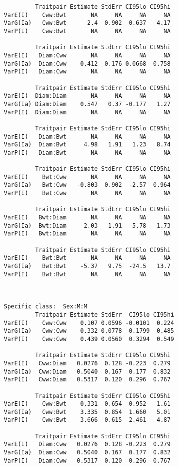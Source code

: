 \documentclass[titlepage]{article}  %
\begin{document}
\begin{verbatim}
         Traitpair Estimate StdErr CI95lo CI95hi
VarE(I)    Cww:Bwt       NA     NA     NA     NA
VarG(Ia)   Cww:Bwt      2.4  0.902  0.637   4.17
VarP(I)    Cww:Bwt       NA     NA     NA     NA

         Traitpair Estimate StdErr CI95lo CI95hi
VarE(I)   Diam:Cww       NA     NA     NA     NA
VarG(Ia)  Diam:Cww    0.412  0.176 0.0668  0.758
VarP(I)   Diam:Cww       NA     NA     NA     NA

         Traitpair Estimate StdErr CI95lo CI95hi
VarE(I)  Diam:Diam       NA     NA     NA     NA
VarG(Ia) Diam:Diam    0.547   0.37 -0.177   1.27
VarP(I)  Diam:Diam       NA     NA     NA     NA

         Traitpair Estimate StdErr CI95lo CI95hi
VarE(I)   Diam:Bwt       NA     NA     NA     NA
VarG(Ia)  Diam:Bwt     4.98   1.91   1.23   8.74
VarP(I)   Diam:Bwt       NA     NA     NA     NA

         Traitpair Estimate StdErr CI95lo CI95hi
VarE(I)    Bwt:Cww       NA     NA     NA     NA
VarG(Ia)   Bwt:Cww   -0.803  0.902  -2.57  0.964
VarP(I)    Bwt:Cww       NA     NA     NA     NA

         Traitpair Estimate StdErr CI95lo CI95hi
VarE(I)   Bwt:Diam       NA     NA     NA     NA
VarG(Ia)  Bwt:Diam    -2.03   1.91  -5.78   1.73
VarP(I)   Bwt:Diam       NA     NA     NA     NA

         Traitpair Estimate StdErr CI95lo CI95hi
VarE(I)    Bwt:Bwt       NA     NA     NA     NA
VarG(Ia)   Bwt:Bwt    -5.37   9.75  -24.5   13.7
VarP(I)    Bwt:Bwt       NA     NA     NA     NA



Specific class:  Sex:M:M 
         Traitpair Estimate StdErr  CI95lo CI95hi
VarE(I)    Cww:Cww    0.107 0.0596 -0.0101  0.224
VarG(Ia)   Cww:Cww    0.332 0.0778  0.1799  0.485
VarP(I)    Cww:Cww    0.439 0.0560  0.3294  0.549

         Traitpair Estimate StdErr CI95lo CI95hi
VarE(I)   Cww:Diam   0.0276  0.128 -0.223  0.279
VarG(Ia)  Cww:Diam   0.5040  0.167  0.177  0.832
VarP(I)   Cww:Diam   0.5317  0.120  0.296  0.767

         Traitpair Estimate StdErr CI95lo CI95hi
VarE(I)    Cww:Bwt    0.331  0.654 -0.952   1.61
VarG(Ia)   Cww:Bwt    3.335  0.854  1.660   5.01
VarP(I)    Cww:Bwt    3.666  0.615  2.461   4.87

         Traitpair Estimate StdErr CI95lo CI95hi
VarE(I)   Diam:Cww   0.0276  0.128 -0.223  0.279
VarG(Ia)  Diam:Cww   0.5040  0.167  0.177  0.832
VarP(I)   Diam:Cww   0.5317  0.120  0.296  0.767


\end{verbatim}
\end{document}
